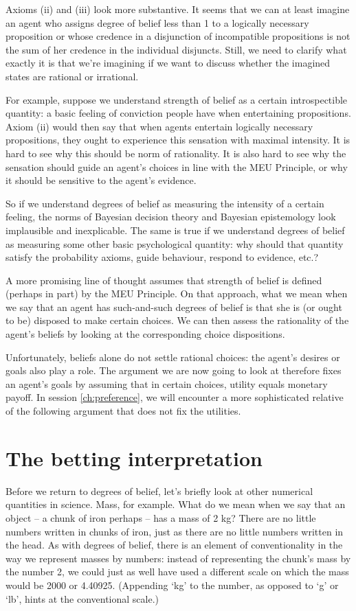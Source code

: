 Axioms (ii) and (iii) look more substantive. It seems that we can at
least imagine an agent who assigns degree of belief less than 1 to a
logically necessary proposition or whose credence in a disjunction of
incompatible propositions is not the sum of her credence in the
individual disjuncts. Still, we need to clarify what exactly it is
that we're imagining if we want to discuss whether the imagined states
are rational or irrational.

For example, suppose we understand strength of belief as a certain
introspectible quantity: a basic feeling of conviction people have
when entertaining propositions. Axiom (ii) would then say that when
agents entertain logically necessary propositions, they ought to
experience this sensation with maximal intensity. It is hard to see
why this should be norm of rationality. It is also hard to see why
the sensation should guide an agent's choices in line with the MEU
Principle, or why it should be sensitive to the agent's evidence.

So if we understand degrees of belief as measuring the intensity of a
certain feeling, the norms of Bayesian decision theory and Bayesian
epistemology look implausible and inexplicable. The same is true if we
understand degrees of belief as measuring some other basic
psychological quantity: why should that quantity satisfy the
probability axioms, guide behaviour, respond to evidence, etc.?

A more promising line of thought assumes that strength of belief is
defined (perhaps in part) by the MEU Principle. On that approach, what
we mean when we say that an agent has such-and-such degrees of belief
is that she is (or ought to be) disposed to make certain choices. We
can then assess the rationality of the agent's beliefs by looking at
the corresponding choice dispositions.

Unfortunately, beliefs alone do not settle rational choices: the
agent's desires or goals also play a role. The argument we are now
going to look at therefore fixes an agent's goals by assuming that in
certain choices, utility equals monetary payoff. In session
\ref{ch:preference}, we will encounter a more sophisticated relative
of the following argument that does not fix the utilities.

\section{The betting interpretation}

Before we return to degrees of belief, let's briefly look at other
numerical quantities in science. Mass, for example. What do we mean
when we say that an object -- a chunk of iron perhaps -- has a mass of
2 kg? There are no little numbers written in chunks of iron, just as
there are no little numbers written in the head. As with degrees of
belief, there is an element of conventionality in the way we represent
masses by numbers: instead of representing the chunk's mass by the
number 2, we could just as well have used a different scale on which
the mass would be 2000 or 4.40925. (Appending `kg' to the number, as
opposed to `g' or `lb', hints at the conventional scale.)

